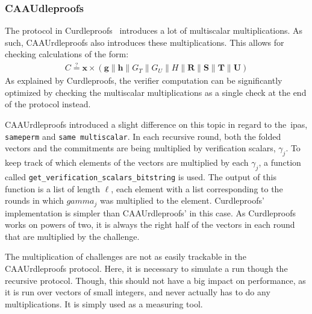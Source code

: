 \subsubsection{CAAUdleproofs}
The protocol in Curdleproofs~\cite{Curdleproofs} introduces a lot of multiscalar multiplications.
As such, CAAUrdleproofs also introduces these multiplications.
This allows for checking calculations of the form:
\begin{align}
    C\stackrel{?}{=}\mathbf{x}\times(\mathbf{g}\|\mathbf{h}\|G_T\|G_U\|H\|\mathbf{R}\|\mathbf{S}\|\mathbf{T}\|\mathbf{U})
\end{align}
As explained by Curdleproofs, the verifier computation can be significantly optimized by checking the multiscalar multiplications as a single check at the end of the protocol instead.

CAAUrdleproofs introduced a slight difference on this topic in regard to the~\glspl{ipa}, \texttt{sameperm} and \texttt{same multiscalar}.
In each recursive round, both the folded vectors and the commitments are being multiplied by verification scalars, $\gamma_j$.
To keep track of which elements of the vectors are multiplied by each $\gamma_j$, a function called \texttt{get\_verification\_scalars\_bitstring} is used.
The output of this function is a list of length $\ell$, each element with a list corresponding to the rounds in which $gamma_j$ was multiplied to the element.
Curdleproofs' implementation is simpler than CAAUrdleproofs' in this case.
As Curdleproofs works on powers of two, it is always the right half of the vectors in each round that are multiplied by the challenge.

The multiplication of challenges are not as easily trackable in the CAAUrdleproofs protocol.
Here, it is necessary to simulate a run though the recursive protocol.
Though, this should not have a big impact on performance, as it is run over vectors of small integers, and never actually has to do any multiplications.
It is simply used as a measuring tool.

